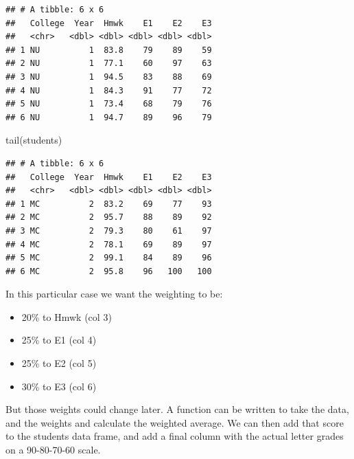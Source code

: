 \documentclass[
]{book}
\newenvironment{Shaded}{\begin{snugshade}}{\end{snugshade}}
\newcommand{\FunctionTok}[1]{\textcolor[rgb]{0.00,0.00,0.00}{#1}}
\newcommand{\NormalTok}[1]{#1}
\providecommand{\tightlist}{%
  \setlength{\itemsep}{0pt}\setlength{\parskip}{0pt}}
\begin{document}
\begin{verbatim}
## # A tibble: 6 x 6
##   College  Year  Hmwk    E1    E2    E3
##   <chr>   <dbl> <dbl> <dbl> <dbl> <dbl>
## 1 NU          1  83.8    79    89    59
## 2 NU          1  77.1    60    97    63
## 3 NU          1  94.5    83    88    69
## 4 NU          1  84.3    91    77    72
## 5 NU          1  73.4    68    79    76
## 6 NU          1  94.7    89    96    79
\end{verbatim}

\begin{Shaded}
\begin{Highlighting}[]
\FunctionTok{tail}\NormalTok{(students)}
\end{Highlighting}
\end{Shaded}

\begin{verbatim}
## # A tibble: 6 x 6
##   College  Year  Hmwk    E1    E2    E3
##   <chr>   <dbl> <dbl> <dbl> <dbl> <dbl>
## 1 MC          2  83.2    69    77    93
## 2 MC          2  95.7    88    89    92
## 3 MC          2  79.3    80    61    97
## 4 MC          2  78.1    69    89    97
## 5 MC          2  99.1    84    89    96
## 6 MC          2  95.8    96   100   100
\end{verbatim}

In this particular case we want the weighting to be:

\begin{itemize}
\tightlist
\item
  20\% to Hmwk (col 3)
\item
  25\% to E1 (col 4)
\item
  25\% to E2 (col 5)
\item
  30\% to E3 (col 6)
\end{itemize}

But those weights could change later. A function can be written to take the data, and the weights and calculate the weighted average. We can then add that score to the students data frame, and add a final column with the actual letter grades on a 90-80-70-60 scale.
\end{document}
